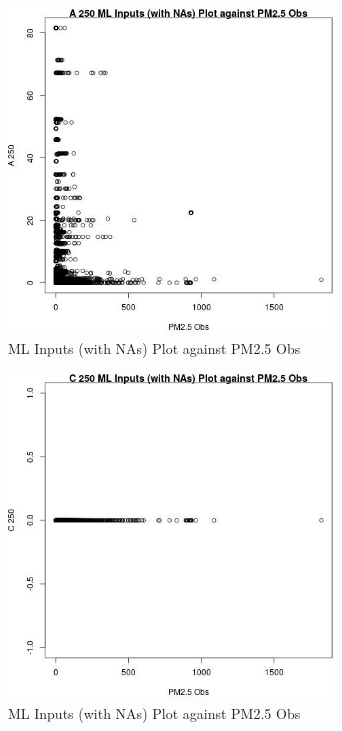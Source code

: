 \begin{figure} 
\centering  
\includegraphics[width=0.77\textwidth]{Code_Outputs/Report_ML_input_PM25_Step4_part_e_de_duplicated_aveswNAs_A_250vPM25_Obs.jpg} 
\caption{\label{fig:Report_ML_input_PM25_Step4_part_e_de_duplicated_aveswNAsA_250vPM25_Obs}ML Inputs (with NAs) Plot against PM2.5 Obs} 
\end{figure} 
 

\begin{figure} 
\centering  
\includegraphics[width=0.77\textwidth]{Code_Outputs/Report_ML_input_PM25_Step4_part_e_de_duplicated_aveswNAs_C_250vPM25_Obs.jpg} 
\caption{\label{fig:Report_ML_input_PM25_Step4_part_e_de_duplicated_aveswNAsC_250vPM25_Obs}ML Inputs (with NAs) Plot against PM2.5 Obs} 
\end{figure} 
 


